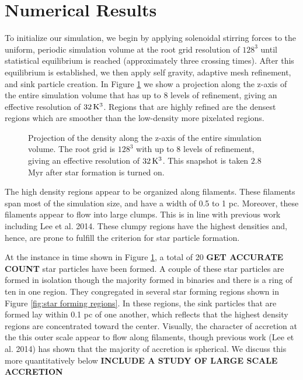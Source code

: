 \documentclass{emulateapj}
\begin{document}
\section{Numerical Results}

To initialize our simulation, we begin by applying solenoidal stirring forces to the uniform, periodic simulation volume at the root grid resolution of $128^3$ until statistical equilibrium is reached (approximately three crossing times). After this equilibrium is established, we then apply self gravity, adaptive mesh refinement, and sink particle creation. In Figure \ref{fig:entire projection} we show a projection along the z-axis of the entire simulation volume that has up to 8 levels of refinement, giving an effective resolution of $32\,{\rm K}^3$. Regions that are highly refined are the densest regions which are smoother than the low-density more pixelated regions.
\begin{figure}
\caption{Projection of the density along the z-axis of the entire simulation volume. The root grid is $128^3$ with up to 8 levels of refinement, giving an effective resolution of $32\,{\rm K}^3$. This snapshot is taken $2.8$Myr after star formation is turned on. \label{fig:entire projection}}
\end{figure}

The high density regions appear to be organized along filaments. These filaments span most of the simulation size, and have a width of 0.5 to 1 pc. Moreover, these filaments appear to flow into large clumps. This is in line with previous work including Lee et al. 2014. These clumpy regions have the highest densities and, hence, are prone to fulfill the criterion for star particle formation.  

At the instance in time shown in Figure \ref{fig:entire projection}, a total of 20 {\bf GET ACCURATE COUNT} star particles have been formed. A couple of these star particles are formed in isolation though the majority formed in binaries and there is a ring of ten in one region. They congregated in several star forming regions shown in Figure \ref{fig:star forming regions}. In these regions, the sink particles that are formed lay within 0.1 pc of one another, which reflects that the highest density regions are concentrated toward the center. Visually, the character of accretion at the this outer scale appear to flow along filaments, though previous work (Lee et al. 2014) has shown that the majority of accretion is spherical. We discuss this more quantitatively below {\bf INCLUDE A STUDY OF LARGE SCALE ACCRETION}
\end{document}
